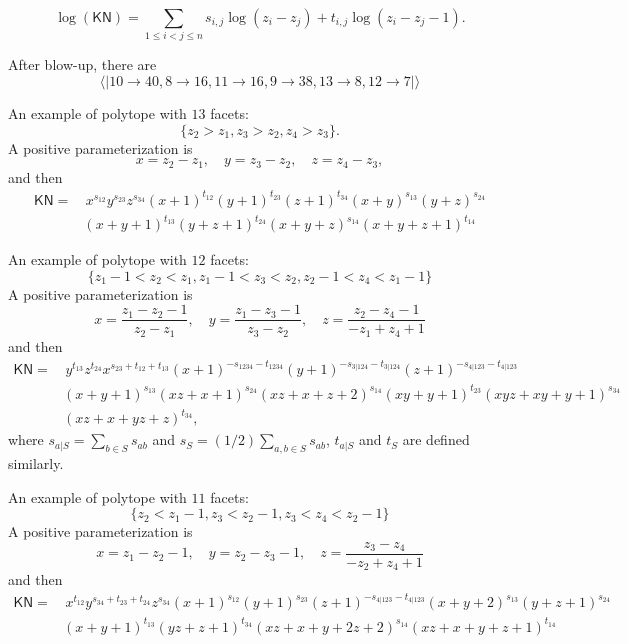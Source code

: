 \documentclass[12pt]{article}
\theoremstyle{definition}
\theoremstyle{plain}
\begin{document}
\[
    \log(\mathsf{KN})=\sum_{1\leq i<j\leq n}s_{i,j} \log \left(z_i-z_j\right)+t_{i,j} \log \left(z_i-z_j-1\right).
\]

After blow-up, there are 
\[
    \langle |10\to 40,8\to 16,11\to 16,9\to 38,13\to 8,12\to 7|\rangle
\]

An example of polytope with $13$ facets:
\[
    \{z_2>z_1, z_3>z_2, z_4>z_3\}.
\]
A positive parameterization is 
\[
    x=z_2-z_1,\quad y=z_3-z_2,\quad z=z_4-z_3,
\]
and then 
\[
\begin{aligned}
    \mathsf{KN} =&\, x^{s_{12}} y^{s_{23}} z^{s_{34}} (x+1)^{t_{12}} (y+1)^{t_{23}} (z+1)^{t_{34}} (x+y)^{s_{13}} (y+z)^{s_{24}}\\
    &(x+y+1)^{t_{13}} (y+z+1)^{t_{24}} (x+y+z)^{s_{14}} (x+y+z+1)^{t_{14}}
\end{aligned}
\]

\vspace{2em}

An example of polytope with $12$ facets:
\[
    \{z_1-1<z_2<z_1, z_1-1<z_3<z_2, z_2-1<z_4<z_1-1\}
\]
A positive parameterization is 
\[
   x=\frac{z_1-z_2-1}{z_2-z_1},\quad y=\frac{z_1-z_3-1}{z_3-z_2},\quad 
   z=\frac{z_2-z_4-1}{-z_1+z_4+1}
\]
and then 
\[
\begin{aligned}
    \mathsf{KN} =&\, y^{t_{13}} z^{t_{24}} x^{s_{23}+t_{12}+t_{13}} (x+1)^{-s_{1234}-t_{1234}} (y+1)^{-s_{3|124}-t_{3|124}} (z+1)^{-s_{4|123}-t_{4|123}} \\
    & (x+y+1)^{s_{13}} (x z+x+1)^{s_{24}}(x z+x+z+2)^{s_{14}} (x y+y+1)^{t_{23}} (x y z+x y+y+1)^{s_{34}} \\
    &(x z+x+y z+z)^{t_{34}},
\end{aligned}
\]
where $s_{a|S}=\sum_{b\in S}s_{ab}$ and $s_{S}=(1/2)\sum_{a,b\in S}s_{ab}$, $t_{a|S}$ and $t_S$ are defined similarly.

\vspace{2em}

An example of polytope with $11$ facets:
\[
    \{z_2<z_1-1, z_3<z_2-1, z_3<z_4<z_2-1\}
\]
A positive parameterization is 
\[
    x=z_1-z_2-1,\quad y=z_2-z_3-1,\quad z=\frac{z_3-z_4}{-z_2+z_4+1}
\]
and then 
\[
\begin{aligned}
    \mathsf{KN} =&\, x^{t_{12}} y^{s_{34}+t_{23}+t_{24}}z^{s_{34}} (x+1)^{s_{12}} (y+1)^{s_{23}} (z+1)^{-s_{4|123}-t_{4|123}} (x+y+2)^{s_{13}} (y+z+1)^{s_{24}} \\
    &(x+y+1)^{t_{13}} (y z+z+1)^{t_{34}} (x z+x+y+2 z+2)^{s_{14}} (x z+x+y+z+1)^{t_{14}}
\end{aligned}
\]
\end{document}
